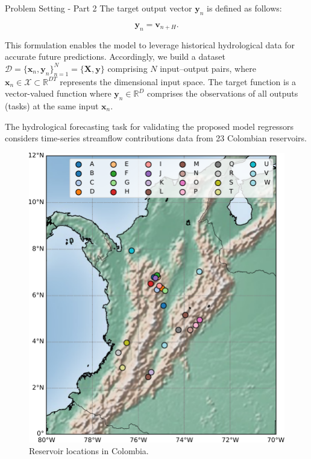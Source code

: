 \documentclass[10pt, xcolor=table]{beamer}
\begin{document}
\begin{frame}{Problem Setting - Part 2}
	The target output vector $\mathbf{y}_n$ is defined as follows:
	
	\begin{equation*}
	\mathbf{y}_n = \mathbf{v}_{n+H}.
	\end{equation*}
	
	This formulation enables the model to leverage historical hydrological data for accurate future predictions. Accordingly, we build a dataset $\mathcal{D} = \{\bm{x}_n, \bm{y}_n\}_{n=1}^N = \{\mathbf{X}, \mathbf{y}\}$ comprising $N$ input--output pairs, where $\bm{x}_n \in \mathcal{X}\subset \mathbb{R}^{DT}$ represents the dimensional input space. The target function is a vector-valued function where $\bm{y}_n \in \mathbb{R}^{D}$ comprises the observations of all outputs (tasks) at the same input $\bm{x}_n$.
\end{frame}

\begin{frame}
	The hydrological forecasting task for validating the proposed model regressors considers time-series streamflow contributions data from 23 Colombian reservoirs.
	\begin{figure}[htbp]
		\centering 
		\includegraphics[height=0.5\textwidth]{images/colombiamap.pdf}
		\caption{Reservoir locations in Colombia.}
	\end{figure}
\end{frame}
\end{document}

